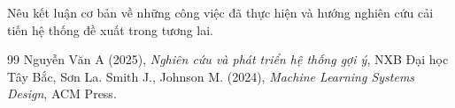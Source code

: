 \documentclass[12pt,a4paper]{report}
\begin{document}
Nêu kết luận cơ bản về những công việc đã thực hiện và hướng nghiên cứu cải tiến hệ thống đề xuất trong tương lai.

\cleardoublepage
{}
\begin{thebibliography}{99}
   Nguyễn Văn A (2025), \textit{Nghiên cứu và phát triển hệ thống gợi ý}, NXB Đại học Tây Bắc, Sơn La.
   Smith J., Johnson M. (2024), \textit{Machine Learning Systems Design}, ACM Press.
\end{thebibliography}
\end{document}

